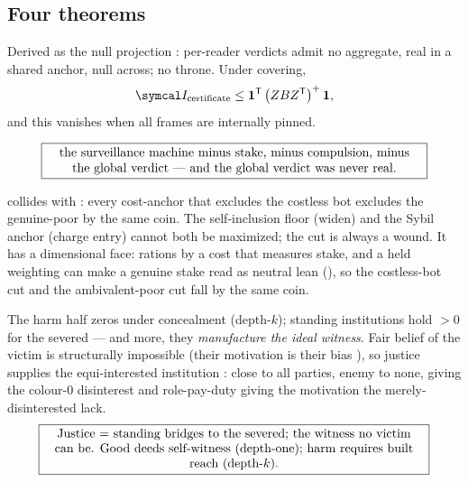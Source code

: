 \documentclass[../main]{subfiles}
\begin{document}
\subsection{Four theorems}
\label{subsec:artifact:theorems}
%
\begin{serieslist}
   Derived as the null projection :
    per-reader verdicts admit no aggregate, real in a shared anchor, null across; no throne.
    Under covering,
    \begin{equation}
      \precision_{\mathrm{certificate}}
      \le
      \mathbf 1\transpose\pinv{\frameloading\anchorprior\frameloading\transpose}\mathbf 1,
      \label{eq:T:certnull-ceiling}
    \end{equation}
    and this vanishes when all frames are internally pinned.

    \begin{equation}
      \boxed{\ \parbox{0.85\linewidth}{\centering
        the surveillance machine minus stake, minus compulsion, minus the global verdict ---
        and the global verdict was never real.}\ }
      \label{eq:T:audited}
    \end{equation}

    collides with : every cost-anchor that excludes the costless
    bot excludes the genuine-poor by the same coin. The self-inclusion floor (widen) and the
    Sybil anchor (charge entry) cannot both be maximized; the cut is always a wound. It has a
    dimensional face:  rations by a cost that measures stake, and a held weighting can make a
    genuine stake read as neutral lean (), so the costless-bot cut and the
    ambivalent-poor cut fall by the same coin.

   The harm half zeros
    under concealment (depth-$k$); standing institutions hold  $>0$ for the severed
    --- and more, they \emph{manufacture the ideal witness}. Fair belief of the victim is
    structurally impossible (their motivation is their bias ), so justice supplies
    the equi-interested institution : close to all parties, enemy to none, 
    giving the colour-$0$ disinterest and role-pay-duty giving the motivation the
    merely-disinterested lack.
    \begin{equation}
      \boxed{\ \parbox{0.86\linewidth}{\centering
        Justice $=$ standing bridges to the severed; the witness no victim can be. Good deeds
        self-witness (depth-one); harm requires built reach (depth-$k$).}\ }
      \label{eq:T:justice}
    \end{equation}
\end{serieslist}
\end{document}
